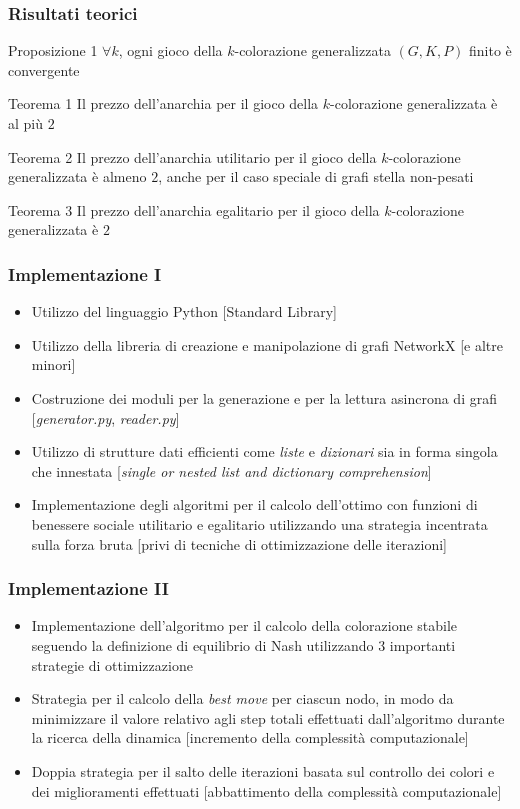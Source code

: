 \documentclass{beamer}
\begin{document}
\begin{frame}
\frametitle{Risultati teorici}
	\begin{alertblock}{Proposizione 1}
		$\forall k$, ogni gioco della $k$-colorazione generalizzata $(G,K,P)$ finito è convergente
	\end{alertblock}
	\begin{alertblock}{Teorema 1}
		Il prezzo dell'anarchia per il gioco della $k$-colorazione generalizzata è al più $2$ 
	\end{alertblock}	
	\begin{alertblock}{Teorema 2}
		Il prezzo dell'anarchia utilitario per il gioco della $k$-colorazione generalizzata è almeno $2$, anche per il caso speciale di grafi stella non-pesati
	\end{alertblock}	
	\begin{alertblock}{Teorema 3}
		Il prezzo dell'anarchia egalitario per il gioco della $k$-colorazione generalizzata è $2$ 
	\end{alertblock}	
\end{frame}


\begin{frame}
\frametitle{Implementazione I}
\begin{itemize}
	\item Utilizzo del linguaggio \alert{Python} [Standard Library]
	\item Utilizzo della libreria di creazione e manipolazione di grafi \alert{NetworkX} [e altre minori]
	\item Costruzione dei moduli per la generazione e per la lettura asincrona di grafi [\textit{generator.py}, \textit{reader.py}]
	\item Utilizzo di \alert{strutture dati} efficienti come \textit{liste} e \textit{dizionari} sia in forma singola che innestata [\textit{single or nested list and dictionary comprehension}]
	\item Implementazione degli \alert{algoritmi per il calcolo dell'ottimo} con funzioni di benessere sociale utilitario e egalitario utilizzando una strategia incentrata sulla forza bruta [privi di tecniche di ottimizzazione delle iterazioni]
\end{itemize}
\end{frame}


\begin{frame}
\frametitle{Implementazione II}
\begin{itemize}
	\item Implementazione dell'\alert{algoritmo per il calcolo della colorazione stabile} seguendo la definizione di equilibrio di Nash utilizzando 3 importanti strategie di ottimizzazione
	\item \alert{Strategia} per il calcolo della \textit{\alert{best move}} per ciascun nodo, in modo da minimizzare il valore relativo agli step totali effettuati dall'algoritmo durante la ricerca della dinamica [incremento della complessità computazionale]
	\item \alert{Doppia strategia} per il \alert{salto delle iterazioni} basata sul controllo dei colori e dei miglioramenti effettuati [abbattimento della complessità computazionale]
\end{itemize}
\end{frame}
\end{document}
